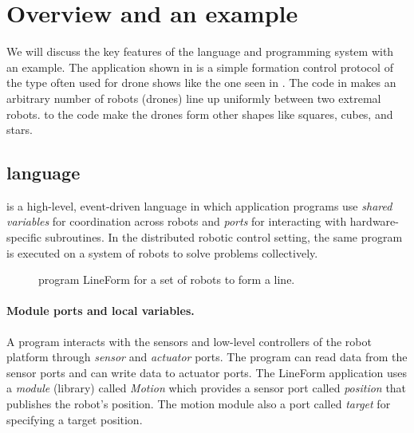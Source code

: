 \section{Overview and an example}
\label{sec:overview}

%
\newcommand{\LineForm}{\textsf{LineForm}\xspace}

We will discuss the key features of the \lgname language and programming system with an example.
The \lgname application shown in  is a simple formation control protocol of the type often used for drone shows like the one seen in .
The code in  makes an arbitrary number of robots (drones) line up uniformly between two extremal robots.
 to the code make the drones form other shapes like  squares, cubes, and stars.

\subsection{\lgname language}
\label{sec:koord-language}
\lgname is a high-level, event-driven language in which application programs use \emph{shared variables} for coordination across robots
and \emph{ports} for interacting with hardware-specific subroutines.
In the distributed robotic control setting, the same \lgname program is executed on a system of robots to solve problems collectively.

\begin{figure}[h!]
    {
        
    }
    {
        
    }
    \caption{\lgname program \LineForm for a set of robots to form a line.}
    \label{fig:lineform}
\end{figure}

\paragraph{Module ports and local variables.}
A \lgname program interacts with the sensors and low-level controllers of the robot platform through \emph{sensor} and \emph{actuator} ports.
The program can read data from the sensor ports and can write data to actuator ports.
%
The \LineForm application uses a \emph{module} (library) called \emph{Motion} which provides a sensor port called \emph{position} that publishes the robot's position.
The motion module also a port called \emph{target} for specifying a target position.


